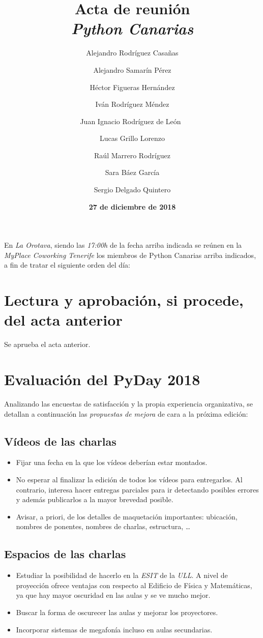 \documentclass[a4paper, 12pt]{article}
\title{\huge \textbf{Acta de reunión} \\ \textit{Python Canarias}}
\date{\textbf{27 de diciembre de 2018}}
\author{
    Alejandro Rodríguez Casañas \and
    Alejandro Samarín Pérez \and
    Héctor Figueras Hernández \and
    Iván Rodríguez Méndez \and
    Juan Ignacio Rodríguez de León\ \and 
    Lucas Grillo Lorenzo \and
    Raúl Marrero Rodríguez \and
    Sara Báez García \and
    Sergio Delgado Quintero
}
\begin{document}
\renewcommand{\contentsname}{Orden del día}

\maketitle

En \textit{La Orotava}, siendo las \textit{17:00h} de la fecha arriba indicada se reúnen en la \textit{MyPlace Coworking Tenerife} los miembros de Python Canarias arriba indicados, a fin de tratar el siguiente orden del día:

\tableofcontents

\section{Lectura y aprobación, si procede, del acta anterior}

Se aprueba el acta anterior.

\section{Evaluación del PyDay 2018}

Analizando las encuestas de satisfacción y la propia experiencia organizativa, se detallan a continuación las \textit{propuestas de mejora} de cara a la próxima edición:

\subsection*{Vídeos de las charlas}

\begin{itemize}
    \item Fijar una fecha en la que los vídeos deberían estar montados.
    \item No esperar al finalizar la edición de todos los vídeos para entregarlos. Al contrario, interesa hacer entregas parciales para ir detectando posibles errores y además publicarlos a la mayor brevedad posible.
    \item Avisar, a priori, de los detalles de maquetación importantes: ubicación, nombres de ponentes, nombres de charlas, estructura, \ldots
\end{itemize}

\subsection*{Espacios de las charlas}

\begin{itemize}
    \item Estudiar la posibilidad de hacerlo en la \textit{ESIT} de la \textit{ULL}. A nivel de proyección ofrece ventajas con respecto al Edificio de Física y Matemáticas, ya que hay mayor oscuridad en las aulas y se ve mucho mejor.
    \item Buscar la forma de oscurecer las aulas y mejorar los proyectores.
    \item Incorporar sistemas de megafonía incluso en aulas secundarias.
\end{itemize}
\end{document}
